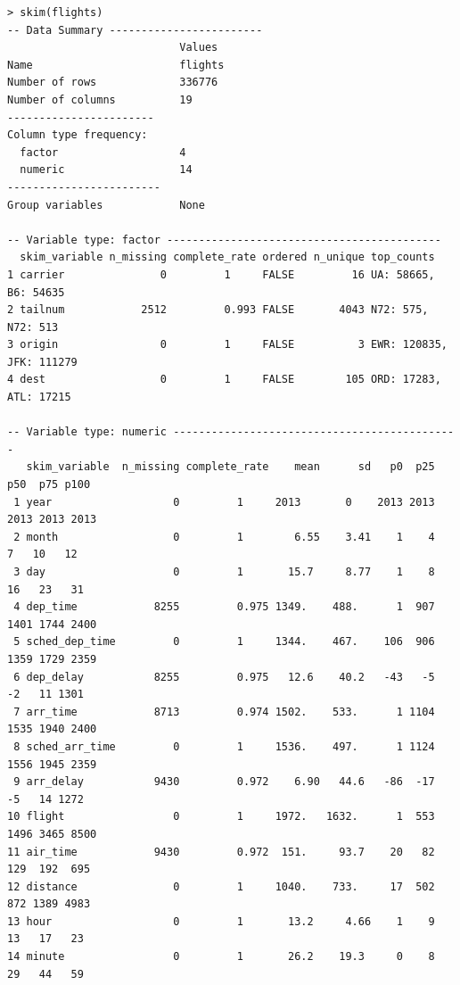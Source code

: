 \documentclass[12pt]{article}
\begin{document}
\begin{Verbatim}[fontsize=\small]
> skim(flights)
-- Data Summary ------------------------
                           Values 
Name                       flights
Number of rows             336776 
Number of columns          19     
-----------------------           
Column type frequency:            
  factor                   4      
  numeric                  14        
------------------------          
Group variables            None   

-- Variable type: factor -------------------------------------------
  skim_variable n_missing complete_rate ordered n_unique top_counts                                    
1 carrier               0         1     FALSE         16 UA: 58665, B6: 54635   
2 tailnum            2512         0.993 FALSE       4043 N72: 575, N72: 513      
3 origin                0         1     FALSE          3 EWR: 120835, JFK: 111279     
4 dest                  0         1     FALSE        105 ORD: 17283, ATL: 17215 

-- Variable type: numeric ---------------------------------------------
   skim_variable  n_missing complete_rate    mean      sd   p0  p25  p50  p75 p100 
 1 year                   0         1     2013       0    2013 2013 2013 2013 2013 
 2 month                  0         1        6.55    3.41    1    4    7   10   12 
 3 day                    0         1       15.7     8.77    1    8   16   23   31 
 4 dep_time            8255         0.975 1349.    488.      1  907 1401 1744 2400 
 5 sched_dep_time         0         1     1344.    467.    106  906 1359 1729 2359 
 6 dep_delay           8255         0.975   12.6    40.2   -43   -5   -2   11 1301 
 7 arr_time            8713         0.974 1502.    533.      1 1104 1535 1940 2400 
 8 sched_arr_time         0         1     1536.    497.      1 1124 1556 1945 2359 
 9 arr_delay           9430         0.972    6.90   44.6   -86  -17   -5   14 1272 
10 flight                 0         1     1972.   1632.      1  553 1496 3465 8500 
11 air_time            9430         0.972  151.     93.7    20   82  129  192  695 
12 distance               0         1     1040.    733.     17  502  872 1389 4983 
13 hour                   0         1       13.2     4.66    1    9   13   17   23 
14 minute                 0         1       26.2    19.3     0    8   29   44   59 










\end{Verbatim}
\end{document}
